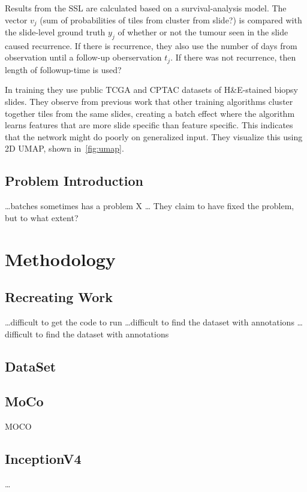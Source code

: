 \documentclass[10pt,twocolumn,letterpaper]{article}
\begin{document}
Results from the \gls{SSL} are calculated based on a survival-analysis model. The vector $v_{j}$ (sum of probabilities of tiles from cluster from slide?) is compared with the slide-level ground truth $y_{j}$ of whether or not the tumour seen in the slide caused recurrence. If there is recurrence, they also use the number of days from observation until a follow-up oberservation $t_{j}$. If there was not recurrence, then length of followup-time is used? %


In training they use public TCGA and CPTAC datasets of H\&E-stained biopsy slides. They observe from previous work that other training algorithms cluster together tiles from the same slides, creating a batch effect where the algorithm learns features that are more slide specific than feature specific. This indicates that the network might do poorly on generalized input. They visualize this using 2D UMAP, shown in~\cref{fig:umap}.



\subsection{Problem Introduction}
\dots{}batches sometimes has a problem X
\dots{} They claim to have fixed the problem, but to what extent?

\section{Methodology}
\subsection{Recreating Work}
\dots{}difficult to get the code to run
\dots{}difficult to find the dataset with annotations
\dots{}difficult to find the dataset with annotations

\subsection{DataSet}

\subsection{MoCo}\label{subsec:moco}
\gls{MOCO}

\subsection{InceptionV4}
\dots{}
\end{document}
